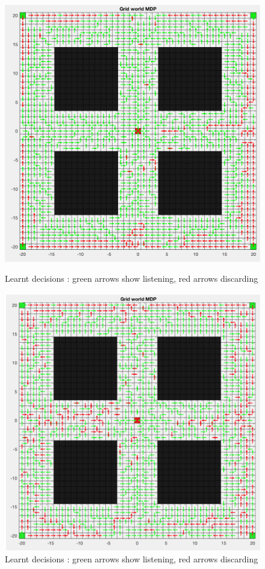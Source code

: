 \documentclass[a4paper]{report}
\begin{document}
{{{{				
				\begin{figure}[ht!]
					\begin{minipage}{0.5\linewidth}
						\begin{center}
							\includegraphics[width=0.9\linewidth]{heatmap_decision_120}
							\caption{Learnt decisions : green arrows show listening, red arrows discarding}
							\label{fig::heatmap_des_120}
						\end{center}
					\end{minipage}
					\begin{minipage}{0.5\linewidth}
						\begin{center}
							\includegraphics[width=0.9\linewidth]{heatmap_decision_50}
							\caption{Learnt decisions : green arrows show listening, red arrows discarding}
							\label{fig::heatmap_des_50}
						\end{center}
					\end{minipage}
				\end{figure}
			
}}}}
\end{document}
